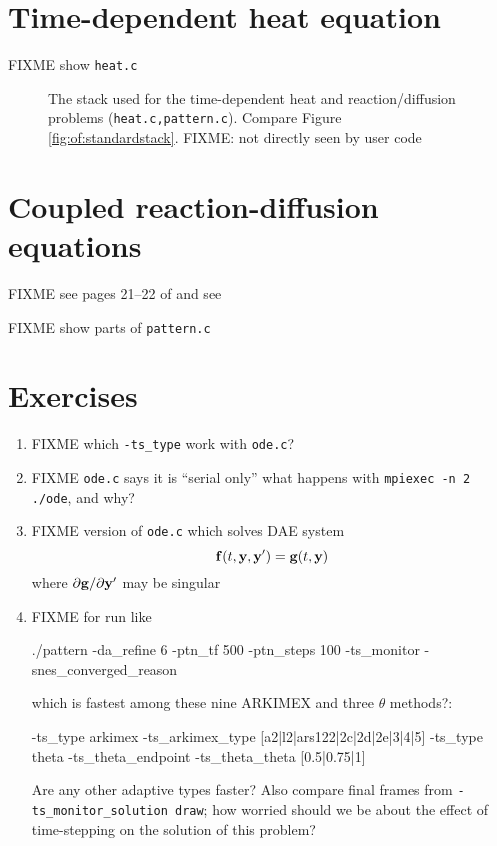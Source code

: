 \section{Time-dependent heat equation}

FIXME show \texttt{heat.c}

\begin{figure}
\caption{The \PETSc stack used for the time-dependent heat and reaction/diffusion problems (\texttt{heat.c,pattern.c}).  Compare Figure \ref{fig:of:standardstack}.  FIXME: \pSNES not directly seen by user code}
\label{fig:of:tsstack}
\end{figure}


\section{Coupled reaction-diffusion equations}

FIXME see pages 21--22 of \citep{HundsdorferVerwer2003} and see \citep{Pearson1993}

FIXME show parts of \texttt{pattern.c}


\section{Exercises}

\renewcommand{\labelenumi}{\arabic{chapter}.\arabic{enumi}\quad}
\renewcommand{\labelenumii}{(\alph{enumii})}
\begin{enumerate}
\item FIXME which \texttt{-ts\_type} work with \texttt{ode.c}?
\item FIXME \texttt{ode.c} says it is ``serial only''  what happens with \texttt{mpiexec -n 2 ./ode}, and why?
\item FIXME version of \texttt{ode.c} which solves DAE system
    $$\mathbf{f}(t,\mathbf{y},\mathbf{y}') = \mathbf{g}(t,\mathbf{y})$$
where $\partial \mathbf{g}/\partial \mathbf{y}'$ may be singular
\item FIXME for run like
\begin{cline}
./pattern -da_refine 6 -ptn_tf 500 -ptn_steps 100 -ts_monitor -snes_converged_reason
\end{cline}
which is fastest among these nine ARKIMEX and three $\theta$ methods?:
\begin{code}
-ts_type arkimex -ts_arkimex_type [a2|l2|ars122|2c|2d|2e|3|4|5]
-ts_type theta -ts_theta_endpoint -ts_theta_theta [0.5|0.75|1]
\end{code}
Are any other adaptive \pTS types faster?  Also compare final frames from \texttt{-ts\_monitor\_solution draw}; how worried should we be about the effect of time-stepping on the solution of this problem?
\end{enumerate}
